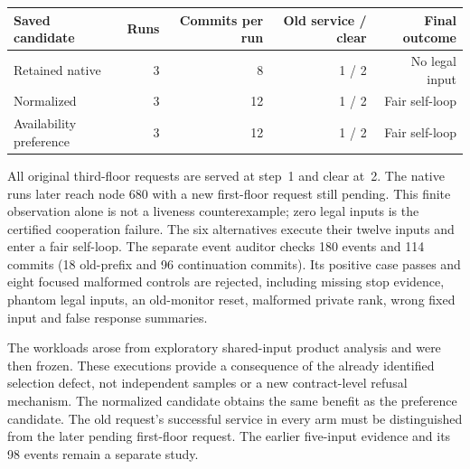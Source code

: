 \begin{center}
\begin{tabular}{lrrrr}\toprule
Saved candidate & Runs & Commits per run & Old service / clear & Final outcome\\\midrule
Retained native &3&8&1 / 2&No legal input\\
Normalized &3&12&1 / 2&Fair self-loop\\
Availability preference &3&12&1 / 2&Fair self-loop\\\bottomrule
\end{tabular}
\end{center}
All original third-floor requests are served at step~1 and clear at~2.
The native runs later reach node 680 with a new first-floor request still
pending. This finite observation alone is not a liveness counterexample;
zero legal inputs is the certified cooperation failure. The six
alternatives execute their twelve inputs and enter a fair self-loop.
The separate event auditor checks 180 events and 114 commits (18 old-prefix and 96 continuation
commits). Its positive
case passes and eight focused malformed controls are rejected, including
missing stop evidence, phantom legal inputs, an old-monitor reset, malformed
private rank, wrong fixed input and false response summaries.

The workloads arose from exploratory shared-input product analysis and
were then frozen. These executions provide a consequence of the already
identified selection defect, not independent samples or a new contract-level
refusal mechanism. The normalized candidate obtains the same benefit as
the preference candidate. The old request's successful service in every
arm must be distinguished from the later pending first-floor request.
The earlier five-input evidence and its 98 events remain a separate study.
